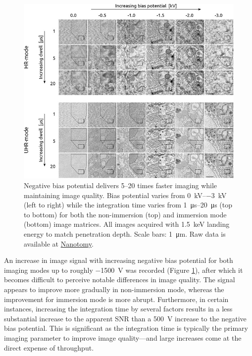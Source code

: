 \begin{figure}[!tb]
    \centering
    \includegraphics[width=\linewidth]{chapter-2/figures_JPEG_LQ/fig2-3_matrices.jpg}
    \caption{Negative bias potential delivers 5--20 times faster imaging while maintaining image quality. Bias potential varies from \SIrange[range-phrase=\text{ to }]{0}{-3}{\kilo\volt} (left to right) while the integration time varies from \SIrange[range-phrase=\text{ to }]{1}{20}{\micro\second} (top to bottom) for both the non-immersion (top) and immersion mode (bottom) image matrices. All images acquired with \SI{1.5}{\kilo\electronvolt} landing energy to match penetration depth. Scale bars: \SI{1}{\micro\meter}. Raw data is available at \href{www.nanotomy.org}{Nanotomy}.}
    \label{fig:2.3_matrices}
\end{figure}

An increase in image signal with increasing negative bias potential for both imaging modes up to roughly \SI{-1500}{\volt} was recorded (Figure \ref{fig:2.3_matrices}), after which it becomes difficult to perceive notable differences in image quality. The signal appears to improve more gradually in non-immersion mode, whereas the improvement for immersion mode is more abrupt. Furthermore, in certain instances, increasing the integration time by several factors results in a less substantial increase to the apparent SNR than a \SI{500}{\volt} increase to the negative bias potential. This is significant as the integration time is typically the primary imaging parameter to improve image quality—and large increases come at the direct expense of throughput.

